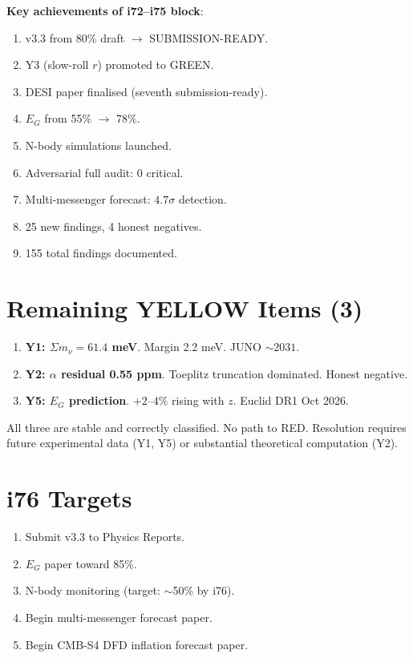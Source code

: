 \documentclass[11pt,a4paper]{article}
\begin{document}
\textbf{Key achievements of i72--i75 block}:
\begin{enumerate}[nosep]
\item v3.3 from 80\% draft $\to$ SUBMISSION-READY.
\item Y3 (slow-roll $r$) promoted to GREEN.
\item DESI paper finalised (seventh submission-ready).
\item $E_G$ from 55\% $\to$ 78\%.
\item N-body simulations launched.
\item Adversarial full audit: 0 critical.
\item Multi-messenger forecast: $4.7\sigma$ detection.
\item 25 new findings, 4 honest negatives.
\item 155 total findings documented.
\end{enumerate}

\section{Remaining YELLOW Items (3)}

\begin{enumerate}
\item \textbf{Y1: $\Sigma m_\nu = 61.4$ meV}. Margin 2.2 meV. JUNO $\sim 2031$.
\item \textbf{Y2: $\alpha$ residual 0.55 ppm}. Toeplitz truncation dominated. Honest negative.
\item \textbf{Y5: $E_G$ prediction}. $+2$--$4\%$ rising with $z$. Euclid DR1 Oct 2026.
\end{enumerate}

All three are stable and correctly classified. No path to RED. Resolution requires future experimental data (Y1, Y5) or substantial theoretical computation (Y2).

\section{i76 Targets}

\begin{enumerate}[nosep]
\item Submit v3.3 to Physics Reports.
\item $E_G$ paper toward 85\%.
\item N-body monitoring (target: $\sim$50\% by i76).
\item Begin multi-messenger forecast paper.
\item Begin CMB-S4 DFD inflation forecast paper.
\end{enumerate}
\end{document}
